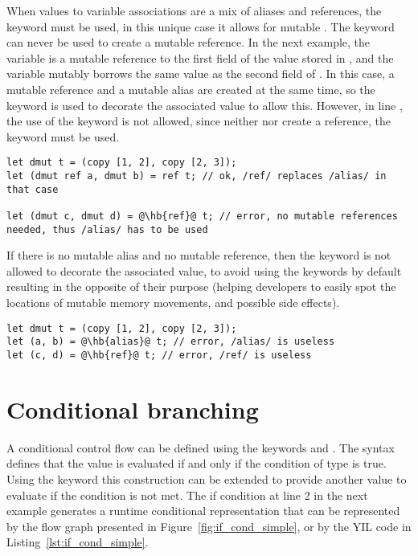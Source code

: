 When values to variable associations are a mix of aliases and references, the
keyword  must be used, in this unique case it allows for mutable
. The  keyword can never be used to create a mutable
reference. In the next example, the variable  is a mutable reference
to the first field of the value stored in , and the variable
 mutably borrows the same value as the second field of . In
this case, a mutable reference and a mutable alias are created at the same time,
so the keyword  is used to decorate the associated value to allow
this. However, in line , the use of the keyword  is not
allowed, since neither  nor  create a reference, the keyword
 must be used.

\begin{lstlisting}[style=coloredverbatim, escapechar=@]
let dmut t = (copy [1, 2], copy [2, 3]);
let (dmut ref a, dmut b) = ref t; // ok, /ref/ replaces /alias/ in that case

let (dmut c, dmut d) = @\hb{ref}@ t; // error, no mutable references needed, thus /alias/ has to be used
\end{lstlisting}

If there is no mutable alias and no mutable reference, then the keyword is not
allowed to decorate the associated value, to avoid using the keywords by default
resulting in the opposite of their purpose (helping developers to easily spot
the locations of mutable memory movements, and possible side effects).

\begin{lstlisting}[style=coloredverbatim, escapechar=@]
let dmut t = (copy [1, 2], copy [2, 3]);
let (a, b) = @\hb{alias}@ t; // error, /alias/ is useless
let (c, d) = @\hb{ref}@ t; // error, /ref/ is useless
\end{lstlisting}

\section{Conditional branching}%
\label{sec:if_else}

A conditional control flow can be defined using the keywords  and
. The syntax  defines that the value  is
evaluated if and only if the condition  of type  is
true. Using the keyword  this construction can be extended to
provide another value to evaluate if the condition is not met. The if condition
at line 2 in the next example generates a runtime conditional representation
that can be represented by the flow graph presented in
Figure~\ref{fig:if_cond_simple}, or by the YIL code in
Listing~\ref{lst:if_cond_simple}.

